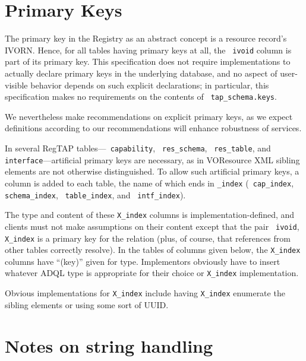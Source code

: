 \documentclass[11pt,a4paper]{ivoa}
\newcommand{\rtent}[1]{\texttt{\color{rtcolor} #1}}
\newcommand{\tapent}[1]{\texttt{\color{tapcolor} #1}}
\begin{document}


\section{Primary Keys}

\label{primarykeys}

The primary key in the Registry as an abstract concept is a resource
record's IVORN.  Hence, for all tables having primary keys at all, the
\rtent{ivoid} column is part of its primary key.  This
specification does not require implementations to actually declare
primary keys in the underlying database, and no aspect of user-visible
behavior depends on such explicit declarations; in particular, this
specification makes no requirements on the contents of
\tapent{tap\_schema.keys}.

We nevertheless make recommendations on explicit primary keys, as
we expect definitions according to our recommendations will enhance
robustness of services.

In several RegTAP tables—\rtent{capability},
\rtent{res\_schema}, \rtent{res\_table}, and
\rtent{interface}—artificial primary keys are necessary, as
in VOResource XML sibling elements are not otherwise distinguished.  To
allow such artificial primary keys, a column is added to each table, the
name of which ends in \texttt{\_index} (\rtent{cap\_index},
\rtent{schema\_index}, \rtent{table\_index}, and
\rtent{intf\_index}).

The type and content of these \texttt{X\_index} columns is
implementation-defined, and clients must not make assumptions on their
content except that the pair \rtent{ivoid}, \texttt{X\_index} is a primary
key for the relation (plus, of course, that references from other tables
correctly resolve).  In the tables of columns given below, the
\texttt{X\_index} columns have ``(key)'' given for type.  Implementors
obviously have to insert whatever ADQL type is appropriate for their
choice or \texttt{X\_index} implementation.

Obvious implementations for \texttt{X\_index} include having
\texttt{X\_index} enumerate the sibling elements or using some sort
of UUID.




\section{Notes on string handling}
\end{document}

